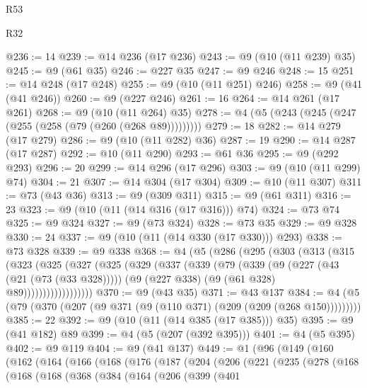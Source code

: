 \begin{lexlean}{R53}
\begin{lexlean}{R32}
\begin{coremodule}
{{{{{{{{{{{{{{{{{{{{{{{{{{{{{{{{{{{{{{{{{{{{{{{{{{{@236 := 14
@239 := @14 @236 (@17 @236)
@243 := @9 (@10 (@11 @239) @35)
@245 := @9 (@61 @35)
@246 := @227 @35
@247 := @9 @246
@248 := 15
@251 := @14 @248 (@17 @248)
@255 := @9 (@10 (@11 @251) @246)
@258 := @9 (@41 (@41 @246))
@260 := @9 (@227 @246)
@261 := 16
@264 := @14 @261 (@17 @261)
@268 := @9 (@10 (@11 @264) @35)
@278 := @4 (@5 (@243 (@245 (@247 (@255 (@258 (@79 (@260 (@268 @89)))))))))
@279 := 18
@282 := @14 @279 (@17 @279)
@286 := @9 (@10 (@11 @282) @36)
@287 := 19
@290 := @14 @287 (@17 @287)
@292 := @10 (@11 @290)
@293 := @61 @36
@295 := @9 (@292 @293)
@296 := 20
@299 := @14 @296 (@17 @296)
@303 := @9 (@10 (@11 @299) @74)
@304 := 21
@307 := @14 @304 (@17 @304)
@309 := @10 (@11 @307)
@311 := @73 (@43 @36)
@313 := @9 (@309 @311)
@315 := @9 (@61 @311)
@316 := 23
@323 := @9 (@10 (@11 (@14 @316 (@17 @316))) @74)
@324 := @73 @74
@325 := @9 @324
@327 := @9 (@73 @324)
@328 := @73 @35
@329 := @9 @328
@330 := 24
@337 := @9 (@10 (@11 (@14 @330 (@17 @330))) @293)
@338 := @73 @328
@339 := @9 @338
@368 := @4
    (@5
      (@286
        (@295
          (@303
            (@313
              (@315
                (@323
                  (@325
                    (@327
                      (@325
                        (@329
                          (@337
                            (@339
                              (@79
                                (@339
                                  (@9
                                    (@227 (@43 (@21 (@73 (@33 @328)))))
                                    (@9 (@227 @338) (@9 (@61 @328) @89))))))))))))))))))
@370 := @9 (@43 @35)
@371 := @43 @137
@384 := @4 (@5 (@79 (@370 (@207 (@9 @371 (@9 (@110 @371) (@209 (@209 (@268 @150)))))))))
@385 := 22
@392 := @9 (@10 (@11 (@14 @385 (@17 @385))) @35)
@395 := @9 (@41 @182) @89
@399 := @4 (@5 (@207 (@392 @395)))
@401 := @4 (@5 @395)
@402 := @9 @119
@404 := @9 (@41 @137)
@449 := @1
    (@96
      (@149
        (@160
          (@162
            (@164
              (@166
                (@168
                  (@176
                    (@187
                      (@204
                        (@206
                          (@221
                            (@235
                              (@278
                                (@168
                                  (@168
                                    (@168
                                      (@368
                                        (@384
                                          (@164
                                            (@206
                                              (@399
                                                (@401
}}}}}}}}}}}}}}}}}}}}}}}}}}}}}}}}}}}}}}}}}}}}}}}}}}}
\end{coremodule}
\end{lexlean}
\end{lexlean}
